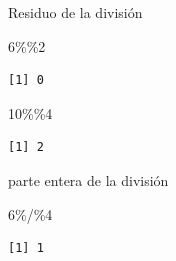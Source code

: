 \documentclass[
  ignorenonframetext,
  aspectratio=169,
  spanish,
]{beamer}
\newenvironment{Shaded}{\begin{snugshade}}{\end{snugshade}}
\newcommand{\DecValTok}[1]{\textcolor[rgb]{0.68,0.00,0.00}{#1}}
\newcommand{\SpecialCharTok}[1]{\textcolor[rgb]{0.37,0.37,0.37}{#1}}
\begin{document}
\begin{frame}[fragile]{Residuo de la división}
\label{residuo-de-la-divisiuxf3n}
\begin{Shaded}
\begin{Highlighting}[]
\DecValTok{6}\SpecialCharTok{\%\%}\DecValTok{2}
\end{Highlighting}
\end{Shaded}

\begin{verbatim}
[1] 0
\end{verbatim}

\begin{Shaded}
\begin{Highlighting}[]
\DecValTok{10}\SpecialCharTok{\%\%}\DecValTok{4}
\end{Highlighting}
\end{Shaded}

\begin{verbatim}
[1] 2
\end{verbatim}
\end{frame}

\begin{frame}[fragile]{parte entera de la división}
\label{parte-entera-de-la-divisiuxf3n}
\begin{Shaded}
\begin{Highlighting}[]
\DecValTok{6}\SpecialCharTok{\%/\%}\DecValTok{4}
\end{Highlighting}
\end{Shaded}

\begin{verbatim}
[1] 1
\end{verbatim}
\end{frame}
\end{document}
